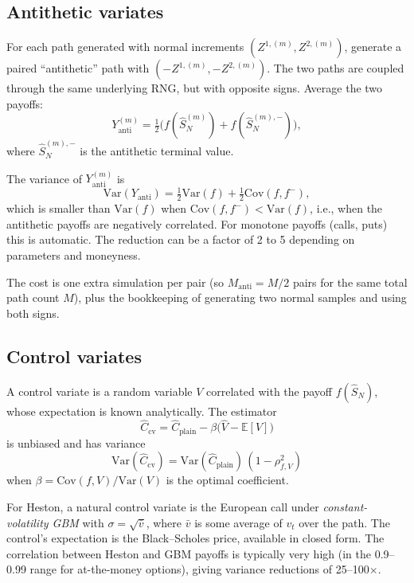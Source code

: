 \documentclass[11pt]{article}
\theoremstyle{plain}
\theoremstyle{definition}
\theoremstyle{remark}
\begin{document}
\subsection{Antithetic variates}

For each path generated with normal increments $(Z^{1,(m)}, Z^{2,(m)})$, generate a paired ``antithetic'' path with $(-Z^{1,(m)}, -Z^{2,(m)})$. The two paths are coupled through the same underlying RNG, but with opposite signs. Average the two payoffs:
\[
    Y^{(m)}_{\mathrm{anti}} = \tfrac12 \bigl(f(\hat S^{(m)}_N) + f(\hat S^{(m), -}_N)\bigr),
\]
where $\hat S^{(m), -}_N$ is the antithetic terminal value.

The variance of $Y^{(m)}_{\mathrm{anti}}$ is
\[
    \mathrm{Var}(Y_{\mathrm{anti}}) = \tfrac12 \mathrm{Var}(f) + \tfrac12 \mathrm{Cov}(f, f^-),
\]
which is smaller than $\mathrm{Var}(f)$ when $\mathrm{Cov}(f, f^-) < \mathrm{Var}(f)$, i.e., when the antithetic payoffs are negatively correlated. For monotone payoffs (calls, puts) this is automatic. The reduction can be a factor of 2 to 5 depending on parameters and moneyness.

The cost is one extra simulation per pair (so $M_{\mathrm{anti}} = M/2$ pairs for the same total path count $M$), plus the bookkeeping of generating two normal samples and using both signs.

\subsection{Control variates}

A control variate is a random variable $V$ correlated with the payoff $f(\hat S_N)$, whose expectation is known analytically. The estimator
\[
    \widehat C_{\mathrm{cv}} = \widehat C_{\mathrm{plain}} - \beta\bigl(\widehat V - \mathbb{E}[V]\bigr)
\]
is unbiased and has variance
\[
    \mathrm{Var}(\widehat C_{\mathrm{cv}}) = \mathrm{Var}(\widehat C_{\mathrm{plain}})\,(1 - \rho^2_{f, V})
\]
when $\beta = \mathrm{Cov}(f, V)/\mathrm{Var}(V)$ is the optimal coefficient.

For Heston, a natural control variate is the European call under \emph{constant-volatility GBM} with $\sigma = \sqrt{\bar v}$, where $\bar v$ is some average of $v_t$ over the path. The control's expectation is the Black--Scholes price, available in closed form. The correlation between Heston and GBM payoffs is typically very high (in the 0.9--0.99 range for at-the-money options), giving variance reductions of 25--100$\times$.
\end{document}
